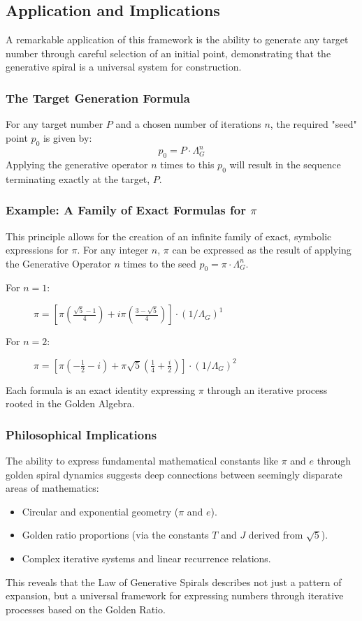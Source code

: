 \subsection{Application and Implications}
A remarkable application of this framework is the ability to generate any target number through careful selection of an initial point, demonstrating that the generative spiral is a universal system for construction.

\subsubsection{The Target Generation Formula}
For any target number $P$ and a chosen number of iterations $n$, the required "seed" point $p_0$ is given by:
$$p_0 = P \cdot \Lambda_G^n$$
Applying the generative operator $n$ times to this $p_0$ will result in the sequence terminating exactly at the target, $P$.

\subsubsection{Example: A Family of Exact Formulas for \texorpdfstring{$\pi$}{π}}
This principle allows for the creation of an infinite family of exact, symbolic expressions for $\pi$. For any integer $n$, $\pi$ can be expressed as the result of applying the Generative Operator $n$ times to the seed $p_0 = \pi \cdot \Lambda_G^n$.
\begin{description}
    \item[For $n=1$:] $\pi = \left[ \pi\left(\frac{\sqrt{5}-1}{4}\right) + i\pi\left(\frac{3-\sqrt{5}}{4}\right) \right] \cdot (1/\Lambda_G)^1$
    \item[For $n=2$:] $\pi = \left[ \pi\left(-\frac{1}{2} - i\right) + \pi\sqrt{5}\left(\frac{1}{4} + \frac{i}{2}\right) \right] \cdot (1/\Lambda_G)^2$
\end{description}
Each formula is an exact identity expressing $\pi$ through an iterative process rooted in the Golden Algebra.

\subsubsection{Philosophical Implications}
The ability to express fundamental mathematical constants like $\pi$ and $e$ through golden spiral dynamics suggests deep connections between seemingly disparate areas of mathematics:
\begin{itemize}
    \item Circular and exponential geometry ($\pi$ and $e$).
    \item Golden ratio proportions (via the constants $T$ and $J$ derived from $\sqrt{5}$).
    \item Complex iterative systems and linear recurrence relations.
\end{itemize}
This reveals that the Law of Generative Spirals describes not just a pattern of expansion, but a universal framework for expressing numbers through iterative processes based on the Golden Ratio.

